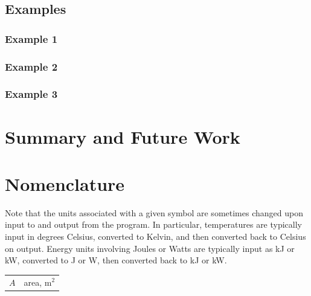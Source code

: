 \documentclass[12pt,twoside]{book}
\begin{document}
\section{Examples}

\subsection{Example 1}

\subsection{Example 2}

\subsection{Example 3}

%
%

\chapter{Summary and Future Work}



\appendix
{}

%
%

\chapter{Nomenclature}
\label{nomenclature}

Note that the units associated with a given symbol are sometimes changed upon input to and output from the program. In particular, temperatures are typically input in degrees Celsius, converted to Kelvin, and then converted back to Celsius on output. Energy units involving Joules or Watts are typically input as kJ or kW, converted to J or W, then converted back to kJ or kW.

\begin{center}
\begin{longtable}{p{1in}  p{5.5 in}}

$A$                 & area, m$^2$ \\
\end{longtable}

\end{center}
\end{document}
